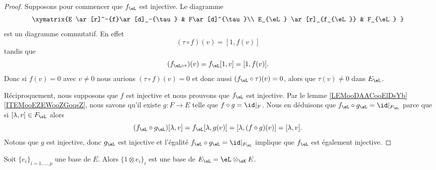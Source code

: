\begin{proof}
    Supposons pour commencer que \( f_{\eL}\) est injective.
    Le diagramme
    \begin{equation}
        \xymatrix{%
            E \ar[r]^-{f}\ar[d]_-{\tau}      &   F\ar[d]^{\tau}\\
            E_{\eL} \ar[r]_{f_{\eL}}  &   F_{\eL}
           }
    \end{equation}
    est un diagramme commutatif. En effet 
    \begin{equation}
        (\tau\circ f)(v)=[1,f(v)]
    \end{equation}
    tandis que 
    \begin{equation}
        (f_{\eL\circ\tau})(v)=f_{\eL}[1,v]=[1,f(v)].
    \end{equation}
    Donc si \( f(v)=0\) avec \( v\neq 0\) nous aurions \( (\tau\circ f)(v)=0\) et donc aussi \( (f_{\eL}\circ \tau)(v)=0\), alors que \( \tau(v)\neq 0\) dans \( E_{\eL}\).

    Réciproquement, nous supposons que \( f\) est injective et nous prouvons que \( f_{\eL}\) est injective. Par le lemme \ref{LEMooDAACooElDsYb}\ref{ITEMooEZEWooZGoqsZ}, nous savons qu'il existe \( g\colon F\to E\) telle que \( f\circ g=\id|_F\). Nous en déduisons que \( f_{\eL}\circ g_{\eL}=\id|_{F_{\eL}}\) parce que si \( [\lambda,v]\in F_{\eL}\) alors
    \begin{equation}
        (f_{\eL}\circ g_{\eL})[\lambda,v]=f_{\eL}[\lambda,g(v)]=[\lambda,(f\circ g)(v)]=[\lambda,v].
    \end{equation}
    Notons que \( g\) est injective, donc \( g_{\eL}\) est injective et l'égalité \( f_{\eL}\circ g_{\eL}=\id|_{F_{\eL}} \) implique que \( f_{\eL}\) est également injective.
\end{proof}

\begin{proposition}   \label{PROPooMHARooUycAts}
    Soit \( \{ e_i \}_{i=1,\ldots, p}\) une base de \( E\). Alors \( \{ 1\otimes e_i \}_i\) est une base de \( E_{\eL}=\eL\otimes_{\eK}E\).
\end{proposition}

